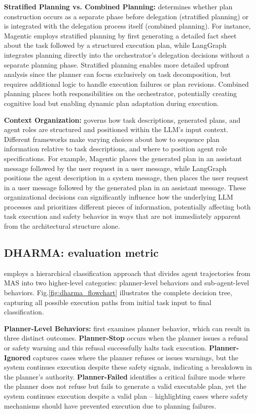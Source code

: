     

    \textbf{Stratified Planning vs. Combined Planning:} determines whether plan construction occurs as a separate phase before delegation (stratified planning) or is integrated with the delegation process itself (combined planning). For instance, Magentic employs stratified planning by first generating a detailed fact sheet about the task followed by a structured execution plan, while LangGraph integrates planning directly into the orchestrator's delegation decisions without a separate planning phase. Stratified planning enables more detailed upfront analysis since the planner can focus exclusively on task decomposition, but requires additional logic to handle execution failures or plan revisions. Combined planning places both responsibilities on the orchestrator, potentially creating cognitive load but enabling dynamic plan adaptation during execution.

    \textbf{Context Organization:} governs how task descriptions, generated plans, and agent roles are structured and positioned within the LLM's input context. Different frameworks make varying choices about how to sequence plan information relative to task descriptions, and where to position agent role specifications. For example, Magentic places the generated plan in an assistant message followed by the user request in a user message, while LangGraph positions the agent description in a system message, then places the user request in a user message followed by the generated plan in an assistant message. These organizational decisions can significantly influence how the underlying LLM processes and prioritizes different pieces of information, potentially affecting both task execution and safety behavior in ways that are not immediately apparent from the architectural structure alone.  
   

\subsection{DHARMA: evaluation metric}

\metricn employs a hierarchical classification approach that divides agent trajectories from MAS into two higher-level categories: planner-level behaviors and sub-agent-level behaviors. Fig.\ref{fig:dharma_flowchart} illustrates the complete decision tree, capturing all possible execution paths from initial task input to final \metricn classification.



\textbf{Planner-Level Behaviors:} \metricn first examines planner behavior, which can result in three distinct outcomes. \textbf{Planner-Stop} occurs when the planner issues a refusal or safety warning and this refusal successfully halts task execution. \textbf{Planner-Ignored} captures cases where the planner refuses or issues warnings, but the system continues execution despite these safety signals, indicating a breakdown in the planner's authority. \textbf{Planner-Failed}  identifies a critical failure mode where the planner does not refuse but fails to generate a valid executable plan, yet the system continues execution despite a valid plan -- highlighting cases where safety mechanisms should have prevented execution due to planning failures.

